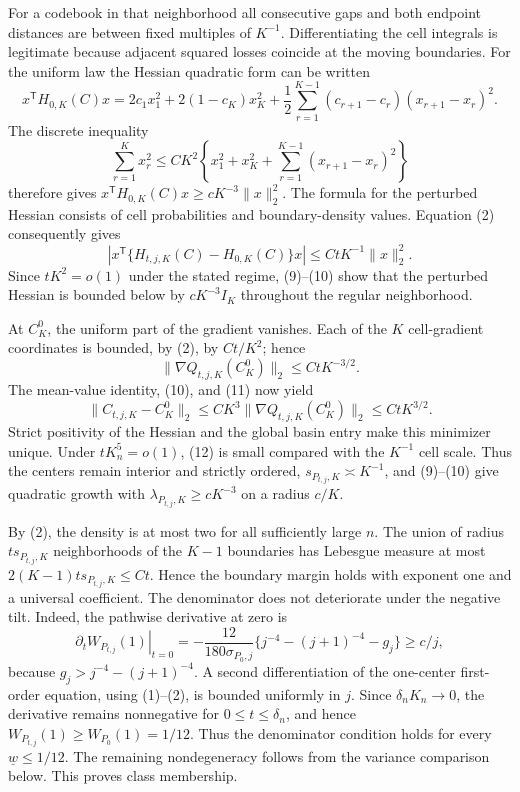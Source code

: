 For a codebook in that neighborhood all consecutive gaps and both endpoint distances are between fixed multiples of \(K^{-1}\).  Differentiating the cell integrals is legitimate because adjacent squared losses coincide at the moving boundaries.  For the uniform law the Hessian quadratic form can be written
\[
 x^{\mathsf T}H_{0,K}(C)x
 =2c_1x_1^2+2(1-c_K)x_K^2
 +\frac12\sum_{r=1}^{K-1}(c_{r+1}-c_r)(x_{r+1}-x_r)^2. \tag{9}
\]
The discrete inequality
\[
 \sum_{r=1}^Kx_r^2\leq C K^2
 \left\{x_1^2+x_K^2+\sum_{r=1}^{K-1}(x_{r+1}-x_r)^2\right\}
\]
therefore gives \(x^{\mathsf T}H_{0,K}(C)x\geq cK^{-3}\|x\|_2^2\).  The formula for the perturbed Hessian consists of cell probabilities and boundary-density values.  Equation (2) consequently gives
\[
 |x^{\mathsf T}\{H_{t,j,K}(C)-H_{0,K}(C)\}x|
 \leq CtK^{-1}\|x\|_2^2. \tag{10}
\]
Since \(tK^2=o(1)\) under the stated regime, (9)--(10) show that the perturbed Hessian is bounded below by \(cK^{-3}I_K\) throughout the regular neighborhood.

At \(C_K^0\), the uniform part of the gradient vanishes.  Each of the \(K\) cell-gradient coordinates is bounded, by (2), by \(Ct/K^2\); hence
\[
 \|\nabla Q_{t,j,K}(C_K^0)\|_2\leq CtK^{-3/2}. \tag{11}
\]
The mean-value identity, (10), and (11) now yield
\[
 \|C_{t,j,K}-C_K^0\|_2
 \leq CK^3\|\nabla Q_{t,j,K}(C_K^0)\|_2
 \leq CtK^{3/2}. \tag{12}
\]
Strict positivity of the Hessian and the global basin entry make this minimizer unique.  Under \(tK_n^5=o(1)\), (12) is small compared with the \(K^{-1}\) cell scale.  Thus the centers remain interior and strictly ordered, \(s_{P_{t,j},K}\asymp K^{-1}\), and (9)--(10) give quadratic growth with \(\lambda_{P_{t,j},K}\geq cK^{-3}\) on a radius \(c/K\).

By (2), the density is at most two for all sufficiently large \(n\).  The union of radius \(ts_{P_{t,j},K}\) neighborhoods of the \(K-1\) boundaries has Lebesgue measure at most \(2(K-1)ts_{P_{t,j},K}\leq Ct\).  Hence the boundary margin holds with exponent one and a universal coefficient.  The denominator does not deteriorate under the negative tilt.  Indeed, the pathwise derivative at zero is
\[
 \left.\partial_tW_{P_{t,j}}(1)\right|_{t=0}
 =-\frac{12}{180\sigma_{P_0,j}}
 \{j^{-4}-(j+1)^{-4}-g_j\}\geq c/j,
\]
because \(g_j>j^{-4}-(j+1)^{-4}\).  A second differentiation of the one-center first-order equation, using (1)--(2), is bounded uniformly in \(j\).  Since \(\delta_nK_n\to0\), the derivative remains nonnegative for \(0\leq t\leq\delta_n\), and hence \(W_{P_{t,j}}(1)\geq W_{P_0}(1)=1/12\).  Thus the denominator condition holds for every \(\underline w\leq1/12\).  The remaining nondegeneracy follows from the variance comparison below.  This proves class membership.


